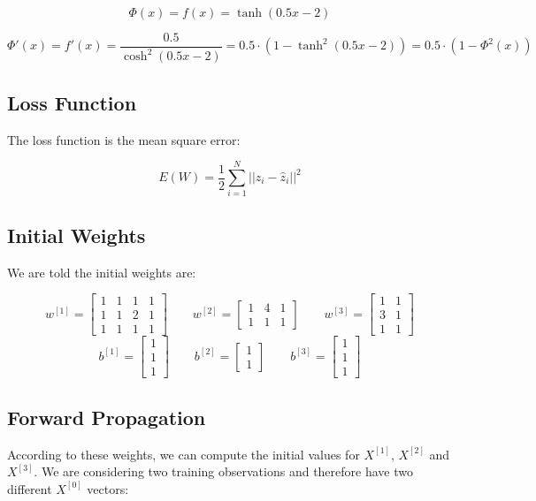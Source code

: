 \documentclass{article}
\begin{document}
\[ \Phi(x) = f(x) = \tanh(0.5x-2) \]

\[ \Phi'(x) = f'(x) = \frac{0.5}{\cosh^2(0.5x-2)} =0.5 \cdot \left( 1 - \tanh^2(0.5x-2) \right) = 0.5 \cdot \left( 1 - \Phi^2(x) \right) \]

\subsection*{Loss Function}

The loss function is the mean square error:

\[ E(W) = \frac{1}{2} \sum_{i=1}^{N} ||z_i - \hat{z}_i||^2 \]

\subsection*{Initial Weights}

We are told the initial weights are:

\[ w^{[1]} = \begin{bmatrix} 1 & 1 & 1 & 1 \\ 1 & 1 & 2 & 1 \\ 1 & 1 & 1 & 1 \end{bmatrix} \qquad w^{[2]} = \begin{bmatrix} 1 & 4 & 1 \\ 1 & 1 & 1 \end{bmatrix} \qquad w^{[3]} = \begin{bmatrix} 1 & 1  \\ 3 & 1 \\ 1 & 1 \end{bmatrix} \]
\[ b^{[1]} = \begin{bmatrix} 1 \\ 1 \\ 1 \end{bmatrix} \qquad b^{[2]} = \begin{bmatrix} 1 \\ 1 \end{bmatrix} \qquad b^{[3]} = \begin{bmatrix} 1 \\ 1 \\ 1 \end{bmatrix} \]

\subsection*{Forward Propagation}

According to these weights, we can compute the initial values for $X^{[1]}$, $X^{[2]}$ and $X^{[3]}$. 
We are considering two training observations and therefore have two different $X^{[0]}$ vectors:
\end{document}
